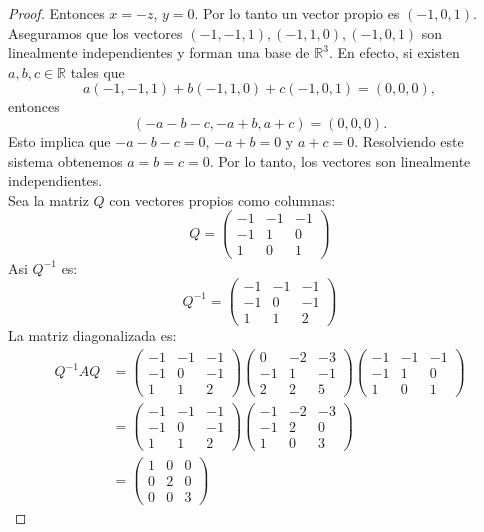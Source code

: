 \documentclass[11pt]{article}
\newcommand{\R}{\mathbb{R}}
\begin{document}
\begin{proof}
Entonces $x = -z$, $y = 0$. Por lo tanto un vector propio es $(-1 , 0 , 1 )$.\\[10pt]

Aseguramos que los vectores $ (-1, -1, 1 ), (-1,1,0),( -1,0,1)$ son linealmente independientes y forman una base de $\R^3$. 
En efecto, si existen $a,b,c \in \R$ tales que
\[
    a(-1, -1, 1 ) + b(-1,1,0) + c(-1,0,1) = (0,0,0),
\]
entonces 
\[(-a-b-c,-a+b,a+c)=(0,0,0).\]
Esto implica que \( -a - b - c = 0\), \( -a + b = 0\) y \( a + c = 0\). Resolviendo este sistema obtenemos \( a = b = c = 0\). Por lo tanto, los vectores son linealmente independientes. \\[10pt]

Sea la matriz $Q$ con vectores propios como columnas:
\[
Q = \begin{pmatrix} -1 & -1 & -1 \\ -1 & 1 & 0 \\ 1 & 0 & 1 \end{pmatrix}
\]
Asi $Q^{-1}$ es:
\[
Q^{-1} = \begin{pmatrix} -1 & -1 & -1 \\ -1 & 0 & -1 \\ 1 & 1 & 2 \end{pmatrix}
\]
La matriz diagonalizada es:
\begin{align*}
    Q^{-1}AQ &= \begin{pmatrix} -1 & -1 & -1 \\ -1 & 0 & -1 \\ 1 & 1 & 2 \end{pmatrix} 
\begin{pmatrix} 0 & -2 & -3 \\ -1 & 1 & -1 \\ 2 & 2 & 5 \end{pmatrix}
\begin{pmatrix} -1 & -1 & -1 \\ -1 & 1 & 0 \\ 1 & 0 & 1 \end{pmatrix}\\
&=\begin{pmatrix} -1 & -1 & -1 \\ -1 & 0 & -1 \\ 1 & 1 & 2 \end{pmatrix} 
\begin{pmatrix} -1 & -2 & -3 \\ -1 & 2 & 0 \\ 1 & 0 & 3 \end{pmatrix} \\
&=\begin{pmatrix} 1 & 0 & 0 \\ 0 & 2 & 0 \\ 0 & 0 & 3 \end{pmatrix}
\end{align*}



\end{proof}
\end{document}
